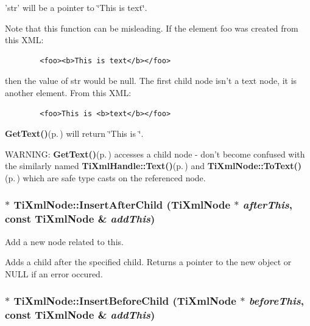 'str' will be a pointer to \char`\"{}This is text\char`\"{}.

Note that this function can be misleading. If the element foo was created from this XML: 

\footnotesize\begin{verbatim}
		<foo><b>This is text</b></foo> 
		\end{verbatim}
\normalsize


then the value of str would be null. The first child node isn't a text node, it is another element. From this XML: 

\footnotesize\begin{verbatim}
		<foo>This is <b>text</b></foo> 
		\end{verbatim}
\normalsize
{\bf Get\-Text()}{\rm (p.\,\pageref{classTiXmlElement_TiXmlElementa27})} will return \char`\"{}This is \char`\"{}.

WARNING: {\bf Get\-Text()}{\rm (p.\,\pageref{classTiXmlElement_TiXmlElementa27})} accesses a child node - don't become confused with the similarly named {\bf Ti\-Xml\-Handle::Text()}{\rm (p.\,\pageref{classTiXmlHandle_TiXmlHandlea17})} and {\bf Ti\-Xml\-Node::To\-Text()}{\rm (p.\,\pageref{classTiXmlNode_TiXmlUnknowna75})} which are safe type casts on the referenced node.
\subsubsection{ $\ast$ Ti\-Xml\-Node::Insert\-After\-Child ({\bf Ti\-Xml\-Node} $\ast$ {\em after\-This}, const {\bf Ti\-Xml\-Node} \& {\em add\-This})\hspace{0.3cm}{\tt  [inherited]}}\label{classTiXmlNode_TiXmlUnknowna35}


Add a new node related to this. 

Adds a child after the specified child. Returns a pointer to the new object or NULL if an error occured.
\subsubsection{ $\ast$ Ti\-Xml\-Node::Insert\-Before\-Child ({\bf Ti\-Xml\-Node} $\ast$ {\em before\-This}, const {\bf Ti\-Xml\-Node} \& {\em add\-This})\hspace{0.3cm}{\tt  [inherited]}}\label{classTiXmlNode_TiXmlUnknowna34}



